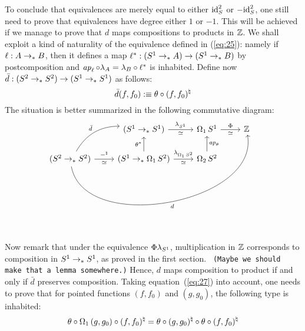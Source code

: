 \documentclass[english,a4]{article}
\begin{document}
To conclude that equivalences are merely equal to either $\mathord{\mathrm{id}}_S^2$ or
$-\mathord{\mathrm{id}}_S^2$, one still need to prove that equivalences have degree
either $1$ or $-1$. This will be achieved if we manage to prove that
$d$ maps compositions to products in $\mathbb{Z}$. We shall exploit a kind of
naturality of the equivalence defined in (\ref{eq:25}): namely if
$\ell:A \to_\ast B$, then it defines a map
$\ell^\ast : ({S^1}\to_\ast A) \to ({S^1} \to_\ast B)$ by postcomposition and
$\mathop{{\it ap}_{\ell}} \circ \lambda_A = \lambda_B \circ \ell^\ast$ is
inhabited. Define now $\bar d: (S^2 \to_\ast S^2) \to ({S^1} \to_\ast {S^1})$
as follows:
\begin{equation}
  \label{eq:29}
  \bar d(f,f_0) \mathrel{\hbox{:}\mkern-5mu\equiv} \theta\circ(f,f_0)^\natural
\end{equation}
The situation is better summarized in the following commutative
diagram:
\begin{equation}
  \label{eq:30}
  \begin{tikzcd}
    {} & (\Sc \ptdto \Sc) \rar["\lambda_{\Sc}","\weq"swap] &
    \loopspace 1 \Sc \rar["\Phi","\weq"swap] & \ZZ
    \\
    (\Sp \ptdto \Sp) \rar["\blank^\natural","\weq"swap] \ar[ur,bend
    left,"\bar d"] \ar[urrr, bend
    right=90,"d"swap] & (\Sc \ptdto \loopspace 1 \Sp)
    \rar["\lambda_{\loopspace 1 \Sp}","\weq"swap] \uar["\theta^\ast"]
    & \loopspace 2 \Sp \uar["\ap\theta"swap] & 
  \end{tikzcd}
\end{equation}
Now remark that under the equivalence $\Phi\lambda_{S^1}$,
multiplication in $\mathbb{Z}$ corresponds to composition in
${S^1} \to_\ast {S^1}$, as proved in the first section. {\tt \color{red}
  (Maybe we should make that a lemma somewhere.)} %
Hence, $d$ maps composition to product if and only if $\bar d$
preserves composition. Taking equation~(\ref{eq:27}) into account, one
needs to prove that for pointed functions $(f,f_0)$ and $(g,g_0)$, the
following type is inhabited:
\begin{equation}
  \label{eq:31}
  \theta \circ \operatorname{\Omega_{1}} {(g,g_0)} \circ (f,f_0)^\natural
  = \theta \circ (g,g_0)^\natural \circ \theta \circ (f,f_0)^\natural  
\end{equation}

\end{document}
